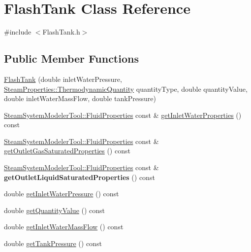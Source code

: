 \hypertarget{class_flash_tank}{}\section{Flash\+Tank Class Reference}
\label{class_flash_tank}


{\ttfamily \#include $<$Flash\+Tank.\+h$>$}

\subsection*{Public Member Functions}
\begin{DoxyCompactItemize}
\item 
\hyperlink{class_flash_tank_ad576e26508da35738127a65fd6ddc35d}{Flash\+Tank} (double inlet\+Water\+Pressure, \hyperlink{class_steam_properties_ae0294bedf7d178c2d8fb6aed0f62fbff}{Steam\+Properties\+::\+Thermodynamic\+Quantity} quantity\+Type, double quantity\+Value, double inlet\+Water\+Mass\+Flow, double tank\+Pressure)
\item 
\hyperlink{struct_steam_system_modeler_tool_1_1_fluid_properties}{Steam\+System\+Modeler\+Tool\+::\+Fluid\+Properties} const  \& \hyperlink{class_flash_tank_a582b3e730f1619891533965940d692de}{get\+Inlet\+Water\+Properties} () const
\item 
\hyperlink{struct_steam_system_modeler_tool_1_1_fluid_properties}{Steam\+System\+Modeler\+Tool\+::\+Fluid\+Properties} const  \& \hyperlink{class_flash_tank_a9db00130ed4419e2e251c9e5ce936572}{get\+Outlet\+Gas\+Saturated\+Properties} () const
\item 
\mbox{\label{class_flash_tank_af65a272b08ca55e4e97b3a00c952a6e7}} 
\hyperlink{struct_steam_system_modeler_tool_1_1_fluid_properties}{Steam\+System\+Modeler\+Tool\+::\+Fluid\+Properties} const  \& {\bfseries get\+Outlet\+Liquid\+Saturated\+Properties} () const
\item 
double \hyperlink{class_flash_tank_a62e8ff97d91da0845526c494022e41da}{get\+Inlet\+Water\+Pressure} () const
\item 
double \hyperlink{class_flash_tank_ab2145598969881df58736a1b65326d17}{get\+Quantity\+Value} () const
\item 
double \hyperlink{class_flash_tank_a2b6dcd9e175a9f2fc550ea91006aa66a}{get\+Inlet\+Water\+Mass\+Flow} () const
\item 
double \hyperlink{class_flash_tank_af5d4f0bf7babe61120e1e4452594e1af}{get\+Tank\+Pressure} () const
\item 

\end{DoxyCompactItemize}
